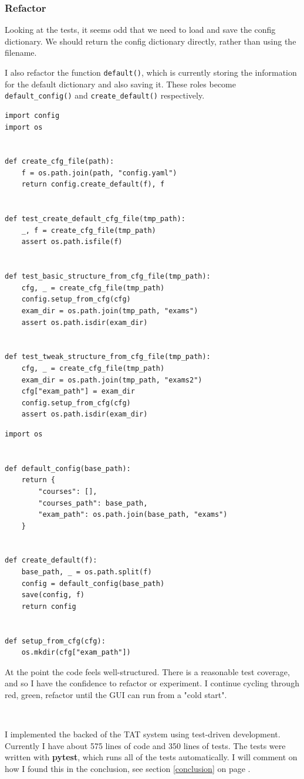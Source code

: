 \documentclass[10pt]{article}
\begin{document}
\subsubsection{Refactor}
Looking at the tests, it seems odd that we need to load and save the config dictionary. We should return the config dictionary directly, rather than using the filename.

I also refactor the function \texttt{default()}, which is currently storing the information for the default dictionary and also saving it. These roles become \texttt{default\_config()} and \texttt{create\_default()} respectively.
\begin{lstlisting}
import config
import os


def create_cfg_file(path):
    f = os.path.join(path, "config.yaml")
    return config.create_default(f), f


def test_create_default_cfg_file(tmp_path):
    _, f = create_cfg_file(tmp_path)
    assert os.path.isfile(f)


def test_basic_structure_from_cfg_file(tmp_path):
    cfg, _ = create_cfg_file(tmp_path)
    config.setup_from_cfg(cfg)
    exam_dir = os.path.join(tmp_path, "exams")
    assert os.path.isdir(exam_dir)


def test_tweak_structure_from_cfg_file(tmp_path):
    cfg, _ = create_cfg_file(tmp_path)
    exam_dir = os.path.join(tmp_path, "exams2")
    cfg["exam_path"] = exam_dir
    config.setup_from_cfg(cfg)
    assert os.path.isdir(exam_dir)
\end{lstlisting}

\begin{lstlisting}
import os


def default_config(base_path):
    return {
        "courses": [],
        "courses_path": base_path,
        "exam_path": os.path.join(base_path, "exams")
    }


def create_default(f):
    base_path, _ = os.path.split(f)
    config = default_config(base_path)
    save(config, f)
    return config


def setup_from_cfg(cfg):
    os.mkdir(cfg["exam_path"])
\end{lstlisting}

At the point the code feels well-structured. There is a reasonable test coverage, and so I have the confidence to refactor or experiment. I continue cycling through red, green, refactor until the GUI can run from a "cold start".

\

I implemented the backed of the TAT system using test-driven development. Currently I have about 575 lines of code and 350 lines of tests. The tests were written with \textbf{pytest}, which runs all of the tests automatically. I will comment on how I found this in the conclusion, see section \ref{conclusion} on page \pageref{conclusion}.
\end{document}
